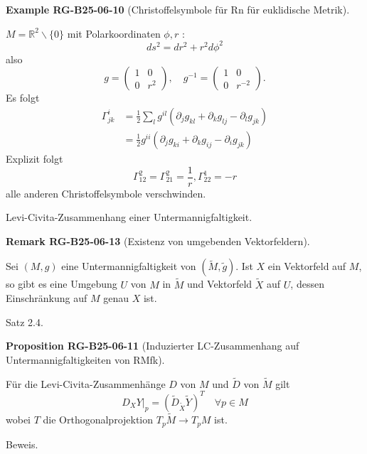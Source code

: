 \documentclass[10pt, letterpaper]{article}
\newcommand{\CustomHeading}[3]{%
  \par\medskip\noindent%
  \textbf{#1 #2} \textnormal{(#3)}.\enskip%
}
\newenvironment{PROP}[2]{\begin{unitbox}\CustomHeading{Proposition}{#1}{#2}}{\end{unitbox}}
\newenvironment{REM}[2]{\begin{unitbox}\CustomHeading{Remark}{#1}{#2}}{\end{unitbox}}
\newenvironment{EXA}[2]{\begin{unitbox}\CustomHeading{Example}{#1}{#2}}{\end{unitbox}}
\begin{document}
\begin{EXA}{RG-B25-06-10}{Christoffelsymbole für Rn für euklidische Metrik}
$M=\mathbb{R}^{2} \backslash\{0\}$ mit Polarkoordinaten $\phi, r$ :
$$
d s^{2}=d r^{2}+r^{2} d \phi^{2}
$$
also
$$
g=\left(\begin{array}{cc}
1 & 0 \\
0 & r^{2}
\end{array}\right), \quad g^{-1}=\left(\begin{array}{cc}
1 & 0 \\
0 & r^{-2}
\end{array}\right) .
$$
Es folgt
$$
\begin{aligned}
\Gamma_{j k}^{i} & =\frac{1}{2} \sum_{l} g^{i l}\left(\partial_{j} g_{k l}+\partial_{k} g_{l j}-\partial_{l} g_{j k}\right) \\
& =\frac{1}{2} g^{i i}\left(\partial_{j} g_{k i}+\partial_{k} g_{i j}-\partial_{i} g_{j k}\right)
\end{aligned}
$$
Explizit folgt
$$
\Gamma_{12}^{2}=\Gamma_{21}^{2}=\frac{1}{r}, \Gamma_{22}^{1}=-r
$$
alle anderen Christoffelsymbole verschwinden.
\end{EXA}




Levi-Civita-Zusammenhang einer Untermannigfaltigkeit. 

\begin{REM}{RG-B25-06-13}{Existenz von umgebenden Vektorfeldern}
Sei $(M, g)$ eine Untermannigfaltigkeit von $(\tilde{M}, \tilde{g})$. Ist $X$ ein Vektorfeld auf $M$, so gibt es eine Umgebung $U$ von $M$ in $\tilde{M}$ und Vektorfeld $\tilde{X}$ auf $U$, dessen Einschränkung auf $M$ genau $X$ ist.
\end{REM}



Satz 2.4. 


\begin{PROP}{RG-B25-06-11}{Induzierter LC-Zusammenhang auf Untermannigfaltigkeiten von RMfk}
Für die Levi-Civita-Zusammenhänge $D$ von $M$ und $\tilde{D}$ von $\tilde{M}$ gilt
\begin{equation*}
\left.D_{X} Y\right|_{p}=\left(\tilde{D}_{\tilde{X}} \tilde{Y}\right)^{T} \quad \forall p \in M \tag{1}
\end{equation*}
wobei $T$ die Orthogonalprojektion $T_{p} \tilde{M} \rightarrow T_{p} M$ ist.
\end{PROP}


Beweis. 
\end{document}
